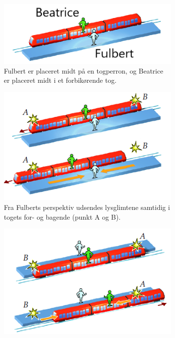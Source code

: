\begin{figure}[t]
    \centering
    \begin{subfigure}[t]{.31\textwidth}
        \centering
        \includegraphics[width=\columnwidth]{Rel/RelLorent/EinsteinTrainExperiment1.PNG}
        \caption{Fulbert er placeret midt på en togperron, og Beatrice er placeret midt i et forbikørende tog.}
        \label{fig:EinsteinsTrainExperiment1}
    \end{subfigure}
    \hfill
    \begin{subfigure}[t]{.31\textwidth}
        \centering
        \includegraphics[width=\columnwidth]{Rel/RelLorent/EinsteinTrainExperiment2.PNG}
        \caption{Fra Fulberts perspektiv udsendes lysglimtene samtidig i togets for- og bagende (punkt A og B).}
        \label{fig:EinsteinsTrainExperiment2}
    \end{subfigure}
    \hfill
    \begin{subfigure}[t]{.31\textwidth}
        \centering
        \includegraphics[width=\columnwidth]{Rel/RelLorent/EinsteinTrainExperiment3.PNG}

\end{subfigure}
\end{figure}
